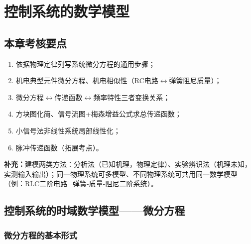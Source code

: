 \chapter{控制系统的数学模型}

\setlength{\parskip}{0.8ex plus 0.3ex minus 0.2ex}   %
\renewcommand{\arraystretch}{1.5}      %
\setlength{\tabcolsep}{10pt}           %
\addtolength{\abovedisplayskip}{2pt}   %
\addtolength{\belowdisplayskip}{2pt}   %

\bigskip  %

\section{本章考核要点}
\begin{enumerate}
    \item 依据物理定律列写系统微分方程的通用步骤；
    \item 机电典型元件微分方程、机电相似性（RC电路$\leftrightarrow$弹簧阻尼质量）；
    \item 微分方程$\leftrightarrow$传递函数$\leftrightarrow$频率特性三者变换关系；
    \item 方块图化简、信号流图+梅森增益公式求总传递函数；
    \item 小信号法非线性系统局部线性化；
    \item 脉冲传递函数（拓展考点）。
\end{enumerate}
\noindent\textbf{补充：}建模两类方法：分析法（已知机理，物理定律）、实验辨识法（机理未知，实测输入输出）；同一物理系统可多模型、不同物理系统可共用同一数学模型（例：RLC二阶电路=弹簧-质量-阻尼二阶系统）。

\medskip

\section{控制系统的时域数学模型——微分方程}
\subsection{微分方程的基本形式}

